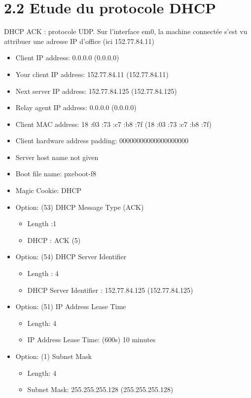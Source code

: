 \documentclass{article}
\begin{document}
\section*{2.2 Etude du protocole DHCP}

DHCP ACK : protocole UDP.
Sur l'interface em0, la machine connectée s'est vu attribuer une adresse IP d'office (ici 152.77.84.11)

\begin{itemize}\renewcommand{\labelitemi}{$\bullet$}
	\item  Client IP address: 0.0.0.0 (0.0.0.0)
	\item  Your client IP address: 152.77.84.11 (152.77.84.11)
	\item  Next server IP address: 152.77.84.125 (152.77.84.125)
	\item  Relay agent IP address: 0.0.0.0 (0.0.0.0)
	\item  Client MAC address: 18 :03 :73 :c7 :b8 :7f (18 :03 :73 :c7 :b8 :7f)
	\item Client hardware address padding: 00000000000000000000
	\item  Server host name not given
	\item  Boot file name: pxeboot-f8
	\item  Magic Cookie: DHCP
	\item  Option: (53) DHCP Message Type (ACK)
	\begin{itemize}
		\item Length :1
		\item DHCP : ACK (5)
	\end{itemize}
	\item  Option: (54) DHCP Server Identifier
	\begin{itemize}
		\item Length : 4
		\item DHCP Server Identifier : 152.77.84.125 (152.77.84.125)
	\end{itemize}
	\item  Option: (51) IP Address Lease Time
	\begin{itemize}
		\item Length: 4
		\item IP Address Lease Time: (600s) 10 minutes
	\end{itemize}
	\item  Option: (1) Subnet Mask
	\begin{itemize}
		\item Length: 4
		\item Subnet Mask: 255.255.255.128 (255.255.255.128)

\end{itemize}
\end{itemize}
\end{document}
